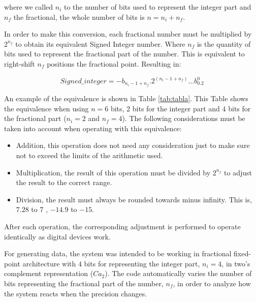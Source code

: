 where we called $n_i$ to the number of bits used to represent the integer part and $n_f$ the fractional, the whole number of bits is $n=n_i+n_f$.

In order to make this conversion, each fractional number must be
multiplied by $2^{n_f}$ to obtain its equivalent Signed Integer
number. Where $n_f$ is the quantity of bits used to represent the
fractional part of the number. This is equivalent to right-shift $n_f$
positions the fractional point. Resulting in:

\begin{equation}\label{eq:eqentero}
Signed\_integer= -b_{n_i-1+n_f}.2^{(n_i-1+n_f)} \dots b_0.2^0
\end{equation}

An example of the equivalence is shown in Table \ref{tab:tabla}. This Table shows the equivalence when
using $n=6$ bits, $2$ bits for the integer part and $4$ bits
for the fractional part ($n_i=2$ and  $n_f=4$).
The following considerations must be taken into account when operating with this equivalence:

\begin{itemize}
    \item Addition, this operation does not need any consideration just to make sure not to exceed the limits of the arithmetic used.
    \item Multiplication, the result of this operation must be divided by $2^{n_f}$ to adjust the result to the correct range.
    \item Division, the result must always be rounded towards minus infinity. This is, $7.28$ to $7$ , $-14.9$ to $-15$.
\end{itemize}

After each operation, the corresponding adjustment is performed to operate identically as digital devices work.

For generating data, the system was intended to be working in fractional fixed-point
architecture with $4$ bits for representing the integer
part, $n_i=4$, in two's complement representation ($Ca_2$). The code automatically varies the
number of bits representing the fractional part of the number, $n_f$,
in order to analyze how the system reacts when the precision
changes.


